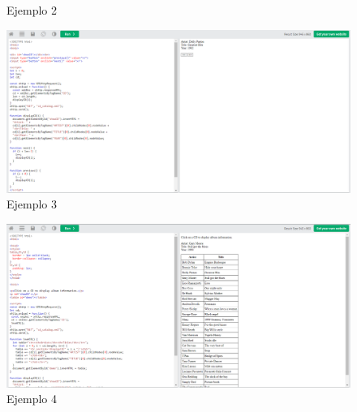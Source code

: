 \documentclass{article}
\begin{document}
\begin{itemize}
\begin{figure}[H]
			\caption{Ejemplo 2}
		\end{figure}
		\newpage
		\begin{figure}[H]
			\centering
			\includegraphics[width=1\textwidth,keepaspectratio]{img/ejemplo33.png}
			\caption{Ejemplo 3}
		\end{figure}
		\begin{figure}[H]
			\centering
			\includegraphics[width=1\textwidth,keepaspectratio]{img/ejemplo34.png}
			\caption{Ejemplo 4}
		\end{figure}
	\end{itemize}
    \newpage
\end{document}

